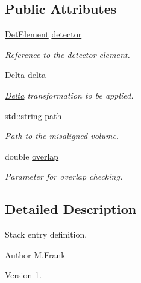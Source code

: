 \subsection*{Public Attributes}
\begin{DoxyCompactItemize}
\item 
\hyperlink{class_d_d4hep_1_1_geometry_1_1_det_element}{Det\+Element} \hyperlink{struct_d_d4hep_1_1_alignments_1_1_alignment_stack_1_1_stack_entry_aa74274273fd1aad6e46c77e9983b8e5c}{detector}
\begin{DoxyCompactList}\small\item\em Reference to the detector element. \end{DoxyCompactList}\item 
\hyperlink{class_d_d4hep_1_1_alignments_1_1_delta}{Delta} \hyperlink{struct_d_d4hep_1_1_alignments_1_1_alignment_stack_1_1_stack_entry_a4ef9eea2ab457bd908d8050f5a5d553e}{delta}
\begin{DoxyCompactList}\small\item\em \hyperlink{class_d_d4hep_1_1_alignments_1_1_delta}{Delta} transformation to be applied. \end{DoxyCompactList}\item 
std\+::string \hyperlink{struct_d_d4hep_1_1_alignments_1_1_alignment_stack_1_1_stack_entry_a821c8882427c693062524b6573baa92c}{path}
\begin{DoxyCompactList}\small\item\em \hyperlink{class_d_d4hep_1_1_path}{Path} to the misaligned volume. \end{DoxyCompactList}\item 
double \hyperlink{struct_d_d4hep_1_1_alignments_1_1_alignment_stack_1_1_stack_entry_ad911a7daa4d606e7c8454b005064b4e9}{overlap}
\begin{DoxyCompactList}\small\item\em Parameter for overlap checking. \end{DoxyCompactList}\end{DoxyCompactItemize}


\subsection{Detailed Description}
Stack entry definition. 

\begin{DoxyAuthor}{Author}
M.\+Frank 
\end{DoxyAuthor}
\begin{DoxyVersion}{Version}
1. 
\end{DoxyVersion}


